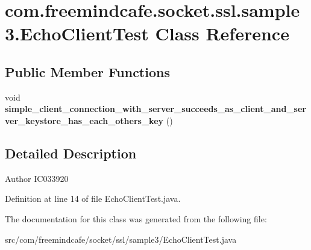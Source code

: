 \hypertarget{classcom_1_1freemindcafe_1_1socket_1_1ssl_1_1sample3_1_1_echo_client_test}{}\section{com.\+freemindcafe.\+socket.\+ssl.\+sample3.\+Echo\+Client\+Test Class Reference}
\label{classcom_1_1freemindcafe_1_1socket_1_1ssl_1_1sample3_1_1_echo_client_test}
\subsection*{Public Member Functions}
\begin{DoxyCompactItemize}
\item 
\hypertarget{classcom_1_1freemindcafe_1_1socket_1_1ssl_1_1sample3_1_1_echo_client_test_ac0126e0c0e2aaa17804891c523278912}{}void {\bfseries simple\+\_\+client\+\_\+connection\+\_\+with\+\_\+server\+\_\+succeeds\+\_\+as\+\_\+client\+\_\+and\+\_\+server\+\_\+keystore\+\_\+has\+\_\+each\+\_\+others\+\_\+key} ()\label{classcom_1_1freemindcafe_1_1socket_1_1ssl_1_1sample3_1_1_echo_client_test_ac0126e0c0e2aaa17804891c523278912}

\end{DoxyCompactItemize}


\subsection{Detailed Description}
\begin{DoxyAuthor}{Author}
I\+C033920 
\end{DoxyAuthor}


Definition at line 14 of file Echo\+Client\+Test.\+java.



The documentation for this class was generated from the following file\+:\begin{DoxyCompactItemize}
\item 
src/com/freemindcafe/socket/ssl/sample3/Echo\+Client\+Test.\+java\end{DoxyCompactItemize}
